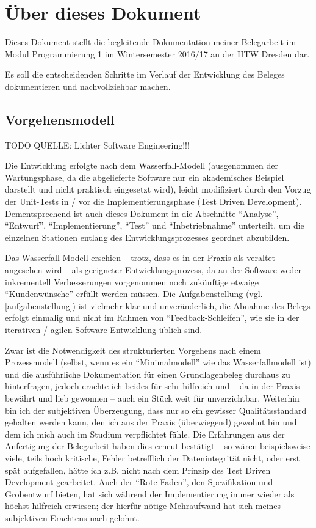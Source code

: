 \section{Über dieses Dokument}

Dieses Dokument stellt die begleitende Dokumentation meiner Belegarbeit im Modul Programmierung 1
im Wintersemester 2016/17 an der HTW Dresden dar.

Es soll die entscheidenden Schritte im Verlauf der Entwicklung des Beleges dokumentieren und
nachvollziehbar machen.

\subsection{Vorgehensmodell}
TODO QUELLE: Lichter Software Engineering!!!

Die Entwicklung erfolgte nach dem Wasserfall-Modell (ausgenommen der Wartungsphase, da die abgelieferte Software
nur ein akademisches Beispiel darstellt und nicht praktisch eingesetzt wird), leicht modifiziert durch den Vorzug der
Unit-Tests in / vor die Implementierungsphase (Test Driven Development). Dementsprechend ist auch dieses Dokument
in die Abschnitte ``Analyse'', ``Entwurf'', ``Implementierung'', ``Test'' und ``Inbetriebnahme''
unterteilt, um die einzelnen Stationen entlang des Entwicklungsprozesses geordnet abzubilden.

Das Wasserfall-Modell erschien -- trotz, dass es in der Praxis als veraltet angesehen wird -- als geeigneter
Entwicklungsprozess, da an der Software weder inkrementell Verbesserungen vorgenommen noch zukünftige etwaige
``Kundenwünsche'' erfüllt werden müssen. Die Aufgabenstellung (vgl. \ref{aufgabenstellung}) ist vielmehr klar und
unveränderlich, die Abnahme des Belegs erfolgt einmalig und nicht im Rahmen von ``Feedback-Schleifen'', wie sie in
der iterativen / agilen Software-Entwicklung üblich sind.

Zwar ist die Notwendigkeit des strukturierten Vorgehens nach einem Prozessmodell (selbst, wenn es ein ``Minimalmodell''
wie das Wasserfallmodell ist) und die ausführliche Dokumentation für einen Grundlagenbeleg durchaus zu hinterfragen,
jedoch erachte ich beides für sehr hilfreich und -- da in der Praxis bewährt und lieb gewonnen -- auch ein Stück weit für
unverzichtbar. Weiterhin bin ich der subjektiven Überzeugung, dass nur so ein gewisser Qualitätsstandard gehalten werden
kann, den ich aus der Praxis (überwiegend) gewohnt bin und dem ich mich auch im Studium verpflichtet fühle.
Die Erfahrungen aus der Anfertigung der Belegarbeit haben dies erneut bestätigt -- so wären beispielsweise viele, teils
hoch kritische, Fehler betrefflich der Datenintegrität nicht, oder erst spät aufgefallen, hätte ich z.B. nicht nach dem
Prinzip des Test Driven Development gearbeitet. Auch der ``Rote Faden'', den Spezifikation und Grobentwurf bieten,
hat sich während der Implementierung immer wieder als höchst hilfreich erwiesen; der hierfür nötige Mehraufwand hat sich
meines subjektiven Erachtens nach gelohnt.
